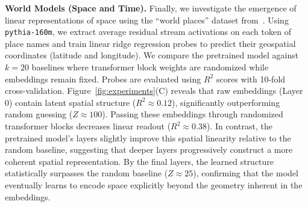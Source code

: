 \textbf{World Models (Space and Time).}
Finally, we investigate the emergence of linear representations of space using the ``world places'' dataset from~\citep{gurnee2024language}. Using \texttt{pythia-160m}, we extract average residual stream activations on each token of place names and train linear ridge regression probes to predict their geospatial coordinates (latitude and longitude). We compare the pretrained model against $k=20$ baselines where transformer block weights are randomized while embeddings remain fixed. Probes are evaluated using $R^2$ scores with 10-fold cross-validation.
Figure~\ref{fig:experiments}(C) reveals that raw embeddings (Layer 0) contain latent spatial structure ($R^2 \approx 0.12$), significantly outperforming random guessing ($Z \approx 100$). Passing these embeddings through randomized transformer blocks decreases linear readout ($R^2 \approx 0.38$). In contrast, the pretrained model's layers slightly improve this spatial linearity relative to the random baseline, suggesting that deeper layers progressively construct a more coherent spatial representation. By the final layers, the learned structure statistically surpasses the random baseline ($Z \approx 25$), confirming that the model eventually learns to encode space explicitly beyond the geometry inherent in the embeddings.




